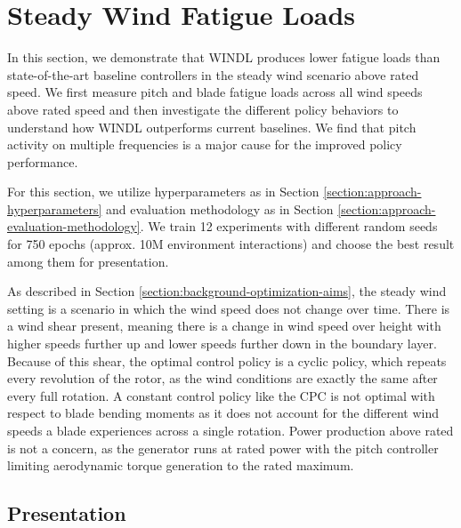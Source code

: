 \section{Steady Wind Fatigue Loads}
\label{section:results-steady-fatigue}

\begin{summary}
In this section, we demonstrate that WINDL produces lower fatigue loads than state-of-the-art baseline controllers in the steady wind scenario above rated speed. We first measure pitch and blade fatigue loads across all wind speeds above rated speed and then investigate the different policy behaviors to understand how WINDL outperforms current baselines. We find that pitch activity on multiple frequencies is a major cause for the improved policy performance.
\end{summary}

For this section, we utilize hyperparameters as in Section \ref{section:approach-hyperparameters} and evaluation methodology as in Section \ref{section:approach-evaluation-methodology}. We train 12 experiments with different random seeds for 750 epochs (approx. 10M environment interactions) and choose the best result among them for presentation.

As described in Section \ref{section:background-optimization-aims}, the steady wind setting is a scenario in which the wind speed does not change over time. There is a wind shear present, meaning there is a change in wind speed over height with higher speeds further up and lower speeds further down in the boundary layer. Because of this shear, the optimal control policy is a cyclic policy, which repeats every revolution of the rotor, as the wind conditions are exactly the same after every full rotation. A constant control policy like the \ac{CPC} is not optimal with respect to blade bending moments as it does not account for the different wind speeds a blade experiences across a single rotation. Power production above rated is not a concern, as the generator runs at rated power with the pitch controller limiting aerodynamic torque generation to the rated maximum.

\subsection{Presentation}

